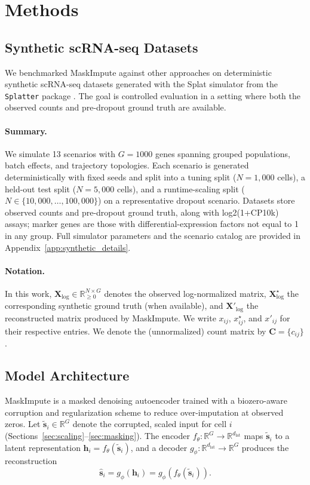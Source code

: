\documentclass{article}
\theoremstyle{plain}
\theoremstyle{definition}
\theoremstyle{remark}
\begin{document}
\section{Methods}
\label{sec:methods}
\subsection{Synthetic scRNA-seq Datasets}
\label{sec:synthetic_data}
We benchmarked MaskImpute against other approaches on deterministic synthetic
scRNA-seq datasets generated with the Splat simulator from the
\texttt{Splatter} package \citep{zappia2017splatter}. The goal is controlled
evaluation in a setting where both the observed counts and pre-dropout ground
truth are available.

\paragraph{Summary.}
We simulate 13 scenarios with $G=1000$ genes spanning grouped populations, batch
effects, and trajectory topologies. Each scenario is generated deterministically
with fixed seeds and split into a tuning split ($N=1{,}000$ cells), a held-out
test split ($N=5{,}000$ cells), and a runtime-scaling split
($N\in\{10{,}000,\ldots,100{,}000\}$) on a representative dropout scenario.
Datasets store observed counts and pre-dropout ground truth, along with
log2(1+CP10k) assays; marker genes are those with differential-expression
factors not equal to 1 in any group. Full simulator parameters and the scenario
catalog are provided in Appendix~\ref{app:synthetic_details}.

\paragraph{Notation.}
In this work, $\mathbf{X}_{\log}\in\mathbb{R}_{\ge 0}^{N\times G}$ denotes the
observed log-normalized matrix, $\mathbf{X}^{\star}_{\log}$ the corresponding
synthetic ground truth (when available), and $\mathbf{X}'_{\log}$ the
reconstructed matrix produced by MaskImpute. We write $x_{ij}$, $x^{\star}_{ij}$,
and $x'_{ij}$ for their respective entries. We denote the (unnormalized) count
matrix by $\mathbf{C}=\{c_{ij}\}$.

\subsection{Model Architecture}
MaskImpute is a masked denoising autoencoder trained with a biozero-aware
corruption and regularization scheme to reduce over-imputation at observed
zeros. Let $\tilde{\mathbf{s}}_i\in\mathbb{R}^G$ denote the corrupted, scaled
input for cell $i$ (Sections~\ref{sec:scaling}--\ref{sec:masking}). The encoder
$f_\theta:\mathbb{R}^{G}\!\to\!\mathbb{R}^{d_{\mathrm{lat}}}$ maps $\tilde{\mathbf{s}}_i$ to a
latent representation $\mathbf{h}_i=f_\theta(\tilde{\mathbf{s}}_i)$, and a
decoder $g_\phi:\mathbb{R}^{d_{\mathrm{lat}}}\!\to\!\mathbb{R}^{G}$ produces the reconstruction
  \[
\hat{\mathbf{s}}_i=g_\phi(\mathbf{h}_i)=g_\phi(f_\theta(\tilde{\mathbf{s}}_i)).
  \]
\end{document}
